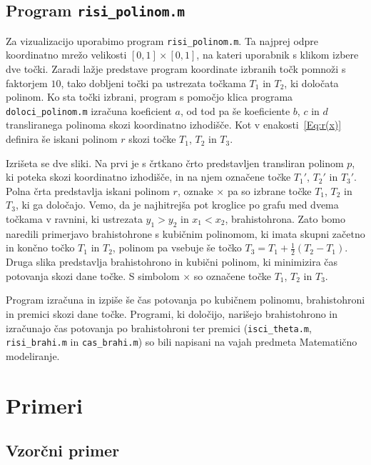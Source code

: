 \documentclass[a4paper]{article}
\begin{document}
\subsection{Program \texttt{risi\_polinom.m}}

Za vizualizacijo uporabimo program \texttt{risi\_polinom.m}.
Ta najprej odpre koordinatno mrežo velikosti $[0,1] \times [0,1]$, na kateri uporabnik s klikom izbere dve točki. Zaradi lažje predstave program koordinate izbranih točk pomnoži s faktorjem $10$, tako dobljeni točki pa ustrezata točkama $T_1$ in $T_2$, ki določata polinom.
Ko sta točki izbrani, program s pomočjo klica programa \texttt{doloci\_polinom.m} izračuna koeficient $a$, od tod pa še koeficiente $b$, $c$ in $d$ transliranega polinoma skozi koordinatno izhodišče. Kot v enakosti~\eqref{Eq:r(x)} definira še iskani polinom $r$ skozi točke $T_1$, $T_2$ in $T_3$.

Izrišeta se dve sliki.
Na prvi je s črtkano črto predstavljen transliran polinom $p$, ki poteka skozi koordinatno izhodišče, in na njem označene točke $T_{1}'$, $T_{2}'$ in $T_{3}'$.
Polna črta predstavlja iskani polinom $r$, oznake $\times$ pa so izbrane točke $T_1$, $T_2$ in $T_3$, ki ga določajo.  
%
Vemo, da je najhitrejša pot kroglice po grafu med dvema točkama v ravnini, ki ustrezata $y_1 > y_2$ in $x_1 < x_2$, brahistohrona. Zato bomo naredili primerjavo brahistohrone s kubičnim polinomom, ki imata skupni začetno in končno točko $T_1$ in $T_2$, polinom pa vsebuje še točko $T_3 = T_1 + \frac{1}{2} (T_2-T_1) $.
Druga slika predstavlja brahistohrono in kubični polinom, ki minimizira čas potovanja skozi dane točke. S simbolom $\times$ so označene točke $T_1$, $T_2$ in $T_3$.

Program izračuna in izpiše še čas potovanja po kubičnem polinomu, brahistohroni in premici skozi dane točke.
Programi, ki določijo, narišejo brahistohrono in izračunajo čas potovanja po brahistohroni ter premici (\texttt{isci\_theta.m}, \texttt{risi\_brahi.m} in \texttt{cas\_brahi.m}) so bili napisani na vajah predmeta Matematično modeliranje. 

\section{Primeri}
\subsection{Vzorčni primer}
\end{document}
